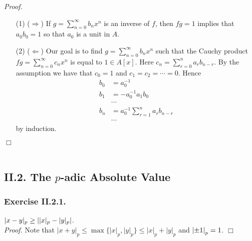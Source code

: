 \documentclass{article}
\begin{document}
\emph{Proof.}
\begin{enumerate}
\item[(1)]
  ($\Longrightarrow$)
  If $g = \sum_{n=0}^{\infty} b_n x^n$ is an inverse of $f$,
  then $fg = 1$ implies that $a_0 b_0 = 1$ so that $a_0$ is a unit in $A$.

\item[(2)]
  ($\Longleftarrow$)
  Our goal is to find $g = \sum_{n=0}^{\infty} b_n x^n$
  such that the Cauchy product
  $fg = \sum_{n=0}^{\infty} c_n x^n$
  is equal to $1 \in A[x]$.
  Here $c_n = \sum_{r = 0}^{n} a_{r} b_{n-r}$.
  By the assumption we have that $c_0 = 1$ and $c_1 = c_2 = \cdots = 0$.
  Hence
  \begin{align*}
    b_0 &= a_0^{-1} \\
    b_1 &= -a_0^{-1} a_1 b_0 \\
    & \cdots \\
    b_n &= a_0^{-1} \sum_{r = 1}^{n} a_r b_{n-r} \\
    & \cdots
  \end{align*}
  by induction.
\end{enumerate}
$\Box$ \\\\






\subsection*{II.2. The $p$-adic Absolute Value \\}



\subsubsection*{Exercise II.2.1.}
\emph{$|x-y|_p \geq \abs{ |x|_p - |y|_p }$.} \\



\emph{Proof.}
Note that $|x+y|_p \leq \max\{ |x|_p, |y|_p \} \leq |x|_p + |y|_p$ and $\abs{\pm 1}_p = 1$.
$\Box$ \\\\
\end{document}
